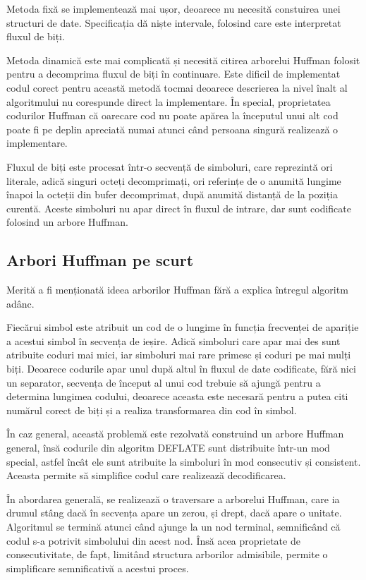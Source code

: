 \documentclass[a4paper,12pt]{report}
\begin{document}
Metoda fixă se implementează mai ușor, deoarece nu necesită constuirea unei structuri de date.
Specificația dă niște intervale, folosind care este interpretat fluxul de biți.

Metoda dinamică este mai complicată și necesită citirea arborelui Huffman
folosit pentru a decomprima fluxul de biți în continuare.
Este dificil de implementat codul corect pentru această metodă tocmai deoarece descrierea
la nivel înalt al algoritmului nu corespunde direct la implementare.
În special, proprietatea codurilor Huffman că oarecare cod nu poate apărea
la începutul unui alt cod poate fi pe deplin apreciată numai atunci
când persoana singură realizează o implementare.

Fluxul de biți este procesat într-o secvență de simboluri,
care reprezintă ori literale, adică singuri octeți decomprimați,
ori referințe de o anumită lungime înapoi la octeții din bufer decomprimat,
după anumită distanță de la poziția curentă.
Aceste simboluri nu apar direct în fluxul de intrare,
dar sunt codificate folosind un arbore Huffman.

\subsection{Arbori Huffman pe scurt}

Merită a fi menționată ideea arborilor Huffman fără a explica întregul algoritm adânc.

Fiecărui simbol este atribuit un cod de o lungime în funcția frecvenței de apariție a acestui simbol
în secvența de ieșire.
Adică simboluri care apar mai des sunt atribuite coduri mai mici,
iar simboluri mai rare primesc și coduri pe mai mulți biți.
Deoarece codurile apar unul după altul în fluxul de date codificate,
fără nici un separator, secvența de început al unui cod trebuie să ajungă pentru a determina lungimea codului,
deoarece aceasta este necesară pentru a putea citi numărul corect de biți și a realiza transformarea din cod în simbol.

În caz general, această problemă este rezolvată construind un arbore Huffman general,
însă codurile din algoritm DEFLATE sunt distribuite într-un mod special,
astfel încât ele sunt atribuite la simboluri în mod consecutiv și consistent.
Aceasta permite să simplifice codul care realizează decodificarea.

În abordarea generală, se realizează o traversare a arborelui Huffman,
care ia drumul stâng dacă în secvența apare un zerou, și drept, dacă apare o unitate.
Algoritmul se termină atunci când ajunge la un nod terminal,
semnificând că codul s-a potrivit simbolului din acest nod.
Însă acea proprietate de consecutivitate,
de fapt, limitând structura arborilor admisibile,
permite o simplificare semnificativă a acestui proces.
\end{document}
